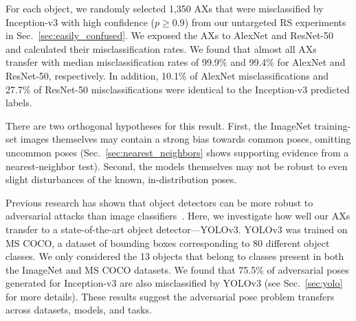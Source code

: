 \documentclass[10pt,twocolumn,letterpaper]{article}
\newcommand{\subsec}[1]{\noindent{\textbf{#1.}}}
\begin{document}

For each object, we randomly selected 1,350 AXs that were misclassified by Inception-v3 with high confidence ($p \geq 0.9$) from our untargeted RS experiments in Sec.~\ref{sec:easily_confused}.
We exposed the AXs to AlexNet and ResNet-50 and calculated their misclassification rates.
We found that almost all AXs transfer with median misclassification rates of 99.9\% and 99.4\% for AlexNet and ResNet-50, respectively.
In addition, 10.1\% of AlexNet misclassifications and 27.7\% of ResNet-50 misclassifications were identical to the Inception-v3 predicted labels.

There are two orthogonal hypotheses for this result. 
First, the ImageNet training-set images themselves may contain a strong bias towards common poses, omitting uncommon poses (Sec.~\ref{sec:nearest_neighbors} shows supporting evidence from a nearest-neighbor test). 
Second, the models themselves may not be robust to even slight disturbances of the known, in-distribution poses.



\subsec{Object detectors}
Previous research has shown that object detectors can be more robust to adversarial attacks than image classifiers~\cite{lu2017-standard}.
Here, we investigate how well our AXs transfer to a state-of-the-art object detector---YOLOv3.
YOLOv3 was trained on MS COCO, a dataset of bounding boxes corresponding to 80 different object classes.
We only considered the 13 objects that belong to classes present in both the ImageNet and MS COCO datasets.
We found that 75.5\% of adversarial poses generated for Inception-v3 are also misclassified by YOLOv3 (see Sec.~\ref{sec:yolo} for more details).
These results suggest the adversarial pose problem transfers across datasets, models, and tasks.
\end{document}
